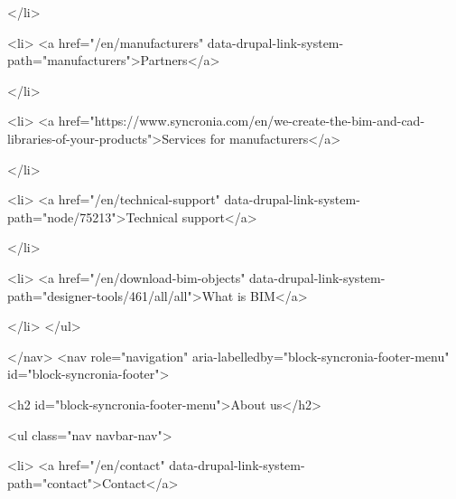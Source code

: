             </li>
        
                   
            
      
            
    

                    <li>
                  <a href="/en/manufacturers" data-drupal-link-system-path="manufacturers">Partners</a>
                    
            </li>
        
                   
            
      
            
    

                    <li>
                  <a href="https://www.syncronia.com/en/we-create-the-bim-and-cad-libraries-of-your-products">Services for manufacturers</a>
                    
            </li>
        
                   
            
      
            
    

                    <li>
                  <a href="/en/technical-support" data-drupal-link-system-path="node/75213">Technical support</a>
                    
            </li>
        
                   
            
      
            
    

                    <li>
                  <a href="/en/download-bim-objects" data-drupal-link-system-path="designer-tools/461/all/all">What is BIM</a>
                    
            </li>
        </ul>
  

  </nav>
<nav role="navigation" aria-labelledby="block-syncronia-footer-menu" id="block-syncronia-footer">
      
  <h2 id="block-syncronia-footer-menu">About us</h2>
  

        
              <ul class="nav navbar-nav">
            
                   
            
      
            
    

                    <li>
                  <a href="/en/contact" data-drupal-link-system-path="contact">Contact</a>
                    
